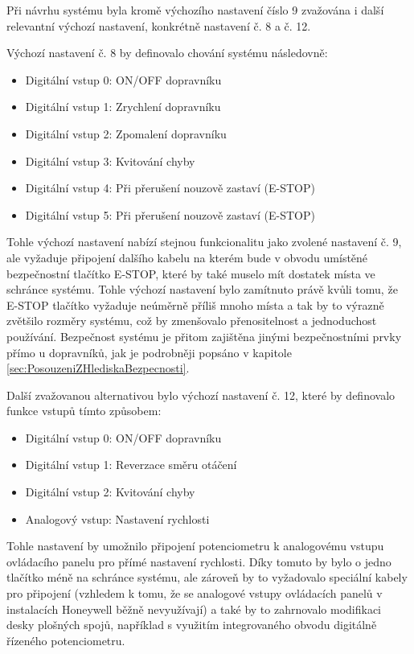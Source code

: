 Při návrhu systému byla kromě výchozího nastavení číslo 9 zvažována i další relevantní výchozí nastavení, konkrétně nastavení č. 8 a č. 12.

Výchozí nastavení č. 8 by definovalo chování systému následovně:
\begin{itemize}
	\item Digitální vstup 0: ON/OFF dopravníku
	\item Digitální vstup 1: Zrychlení dopravníku
	\item Digitální vstup 2: Zpomalení dopravníku
	\item Digitální vstup 3: Kvitování chyby
	\item Digitální vstup 4: Při přerušení nouzově zastaví (E-STOP)
	\item Digitální vstup 5: Při přerušení nouzově zastaví (E-STOP)
\end{itemize}
Tohle výchozí nastavení nabízí stejnou funkcionalitu jako zvolené nastavení č. 9, ale vyžaduje připojení dalšího kabelu na kterém bude v obvodu umístěné bezpečnostní tlačítko E-STOP, které by také muselo mít dostatek místa ve schránce systému. Tohle výchozí nastavení bylo zamítnuto právě kvůli tomu, že E-STOP tlačítko vyžaduje neúměrně příliš mnoho místa a tak by to výrazně zvětšilo rozměry systému, což by zmenšovalo přenositelnost a jednoduchost používání. Bezpečnost systému je přitom zajištěna jinými bezpečnostními prvky přímo u dopravníků, jak je podrobněji popsáno v kapitole \ref{sec:PosouzeniZHlediskaBezpecnosti}.
\cite{SiemensG120DGettingStarted}

Další zvažovanou alternativou bylo výchozí nastavení č. 12, které by definovalo funkce vstupů tímto způsobem:
\begin{itemize}
	\item Digitální vstup 0: ON/OFF dopravníku
	\item Digitální vstup 1: Reverzace směru otáčení
	\item Digitální vstup 2: Kvitování chyby
	\item Analogový vstup: Nastavení rychlosti
\end{itemize}
Tohle nastavení by umožnilo připojení potenciometru k analogovému vstupu ovládacího panelu pro přímé nastavení rychlosti. Díky tomuto by bylo o jedno tlačítko méně na schránce systému, ale zároveň by to vyžadovalo speciální kabely pro připojení (vzhledem k tomu, že se analogové vstupy ovládacích panelů v instalacích Honeywell běžně nevyužívají) a také by to zahrnovalo modifikaci desky plošných spojů, například s využitím integrovaného obvodu digitálně řízeného potenciometru.
\cite{SiemensG120DGettingStarted}

